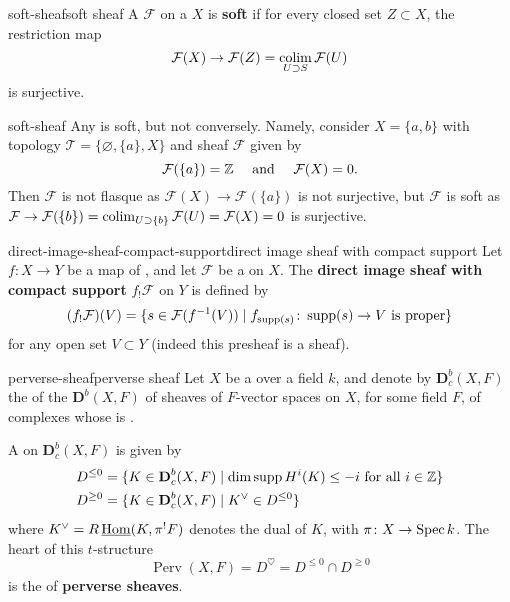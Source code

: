 \begin{topic}{soft-sheaf}{soft sheaf}
    A  $\mathcal{F}$ on a  $X$ is \textbf{soft} if for every closed set $Z \subset X$, the restriction map
    \[ \mathcal{F}(X) \to \mathcal{F}(Z) = \operatorname*{colim}_{U \supset S} \mathcal{F}(U) \]
    is surjective.
\end{topic}

\begin{example}{soft-sheaf}
    Any  is soft, but not conversely. Namely, consider $X = \{ a, b \}$ with topology $\mathcal{T} = \{ \varnothing, \{ a \}, X \}$ and sheaf $\mathcal{F}$ given by
    \[ \mathcal{F}(\{ a \}) = \mathbb{Z} \quad \textup{ and } \quad \mathcal{F}(X) = 0 . \]
    Then $\mathcal{F}$ is not flasque as $\mathcal{F}(X) \to \mathcal{F}(\{ a \})$ is not surjective, but $\mathcal{F}$ is soft as $\mathcal{F} \to \mathcal{F}(\{ b \}) = \operatorname*{colim}_{U \supset \{ b \}} \mathcal{F}(U) = \mathcal{F}(X) = 0$ is surjective.
\end{example}

\begin{topic}{direct-image-sheaf-compact-support}{direct image sheaf with compact support}
    Let $f \colon X \to Y$ be a map of , and let $\mathcal{F}$ be a  on $X$. The \textbf{direct image sheaf with compact support} $f_! \mathcal{F}$ on $Y$ is defined by
    \[ (f_! \mathcal{F})(V) = \{ s \in \mathcal{F}(f^{-1}(V)) \mid f_{\operatorname{supp}(s)} \colon \operatorname{supp}(s) \to V \textup{ is proper} \} \]
    for any open set $V \subset Y$ (indeed this presheaf is a sheaf).
\end{topic}

\begin{topic}{perverse-sheaf}{perverse sheaf}
    Let $X$ be a  over a field $k$, and denote by $\textbf{D}^b_c(X, F)$ the  of the  $\textbf{D}^b(X, F)$ of sheaves of $F$-vector spaces on $X$, for some field $F$, of complexes whose  is .

    A  on $\textbf{D}^b_c(X, F)$ is given by
    \[ \begin{aligned}
        D^{\le 0} &= \{ K \in \textbf{D}^b_c(X, F) \mid \dim \operatorname{supp} H^i(K) \le -i \textup{ for all } i \in \mathbb{Z} \} \\
        D^{\ge 0} &= \{ K \in \textbf{D}^b_c(X, F) \mid K^\vee \in D^{\le 0} \}
    \end{aligned} \]
    where $K^\vee = R\operatorname{\underline{Hom}}(K, \pi^! F)$ denotes the dual of $K$, with $\pi \colon X \to \operatorname{Spec} k$. The heart of this $t$-structure
    \[ \operatorname{Perv}(X, F) = D^\heartsuit = D^{\le 0} \cap D^{\ge 0} \]
    is the  of \textbf{perverse sheaves}.
\end{topic}

